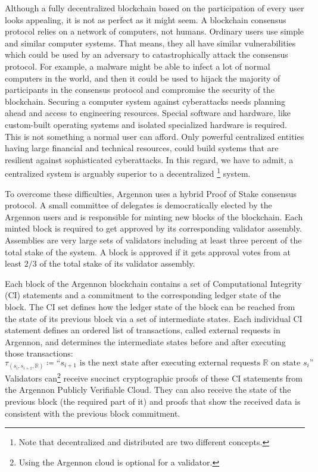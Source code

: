 Although a fully decentralized blockchain based on the participation of every user looks appealing, it is not as perfect
as it might seem. A blockchain consensus protocol relies on a network of computers, not humans. Ordinary users use
simple and similar computer systems. That means, they all have similar vulnerabilities which could be used by an
adversary to catastrophically attack the consensus protocol. For example, a malware might be
able to infect a lot of normal computers in the world, and then it could be used to hijack the majority of
participants in the consensus protocol and compromise the security of the blockchain. Securing a computer
system against cyberattacks needs planning ahead and access to engineering resources. Special software and hardware,
like custom-built operating systems and isolated specialized hardware is required. This is not something a normal
user can afford. Only powerful centralized entities having large financial and technical resources, could build
systems that are resilient against sophisticated cyberattacks. In this regard, we have to admit, a centralized system is
arguably superior to a decentralized \footnote{Note that decentralized and distributed are two different concepts.}
system.

To overcome these difficulties, Argennon uses a hybrid Proof of Stake consensus protocol. A small committee of
delegates is democratically elected
by the Argennon users and is responsible for minting new blocks of the blockchain. Each
minted block is required to get approved by its corresponding validator assembly. Assemblies are very large sets of
validators including at least three percent of the total stake of the system. A block is approved if it gets
approval votes from at least \(2/3\) of the total stake of its validator assembly.

Each block of the Argennon blockchain contains a set of Computational Integrity (CI) statements and a commitment to
the corresponding ledger state of the block. The CI set defines how
the ledger state of the block can be reached from the state of its previous block via a set of intermediate states.
Each individual CI statement defines an ordered list of transactions, called external requests in Argennon, and
determines the intermediate states before and after executing those transactions:
\[
    \tau_{(s_i,s_{i+1},\mathbb{R})} \coloneqq \text{``$s_{i+1}$ is the next state after executing external requests
        $\mathbb{R}$ on state $s_i$''}
\]
Validators can\footnote{Using the Argennon cloud is optional for a validator.} receive succinct cryptographic proofs
of these CI statements from the Argennon Publicly Verifiable Cloud. They can also receive the state of the previous
block (the required part of it) and proofs that show the received data is consistent with the previous block commitment.

